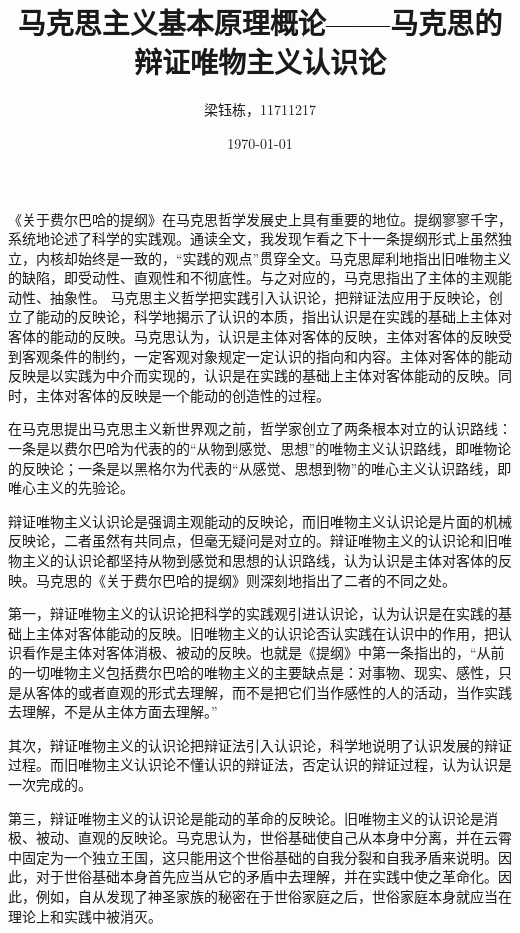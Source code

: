\documentclass{ctexart}
\title{马克思主义基本原理概论——马克思的辩证唯物主义认识论}
\author{梁钰栋，11711217}
\date{\today}
\begin{document}
\maketitle

《关于费尔巴哈的提纲》在马克思哲学发展史上具有重要的地位。提纲寥寥千字，系统地论述了科学的实践观。通读全文，我发现乍看之下十一条提纲形式上虽然独立，内核却始终是一致的，“实践的观点”贯穿全文。马克思犀利地指出旧唯物主义的缺陷，即受动性、直观性和不彻底性。与之对应的，马克思指出了主体的主观能动性、抽象性。
马克思主义哲学把实践引入认识论，把辩证法应用于反映论，创立了能动的反映论，科学地揭示了认识的本质，指出认识是在实践的基础上主体对客体的能动的反映。马克思认为，认识是主体对客体的反映，主体对客体的反映受到客观条件的制约，一定客观对象规定一定认识的指向和内容。主体对客体的能动反映是以实践为中介而实现的，认识是在实践的基础上主体对客体能动的反映。同时，主体对客体的反映是一个能动的创造性的过程。

在马克思提出马克思主义新世界观之前，哲学家创立了两条根本对立的认识路线：一条是以费尔巴哈为代表的的“从物到感觉、思想”的唯物主义认识路线，即唯物论的反映论；一条是以黑格尔为代表的“从感觉、思想到物”的唯心主义认识路线，即唯心主义的先验论。

辩证唯物主义认识论是强调主观能动的反映论，而旧唯物主义认识论是片面的机械反映论，二者虽然有共同点，但毫无疑问是对立的。辩证唯物主义的认识论和旧唯物主义的认识论都坚持从物到感觉和思想的认识路线，认为认识是主体对客体的反映。马克思的《关于费尔巴哈的提纲》则深刻地指出了二者的不同之处。

第一，辩证唯物主义的认识论把科学的实践观引进认识论，认为认识是在实践的基础上主体对客体能动的反映。旧唯物主义的认识论否认实践在认识中的作用，把认识看作是主体对客体消极、被动的反映。也就是《提纲》中第一条指出的，“从前的一切唯物主义包括费尔巴哈的唯物主义的主要缺点是：对事物、现实、感性，只是从客体的或者直观的形式去理解，而不是把它们当作感性的人的活动，当作实践去理解，不是从主体方面去理解。”

其次，辩证唯物主义的认识论把辩证法引入认识论，科学地说明了认识发展的辩证过程。而旧唯物主义认识论不懂认识的辩证法，否定认识的辩证过程，认为认识是一次完成的。

第三，辩证唯物主义的认识论是能动的革命的反映论。旧唯物主义的认识论是消极、被动、直观的反映论。马克思认为，世俗基础使自己从本身中分离，并在云霄中固定为一个独立王国，这只能用这个世俗基础的自我分裂和自我矛盾来说明。因此，对于世俗基础本身首先应当从它的矛盾中去理解，并在实践中使之革命化。因此，例如，自从发现了神圣家族的秘密在于世俗家庭之后，世俗家庭本身就应当在理论上和实践中被消灭。
\end{document}
